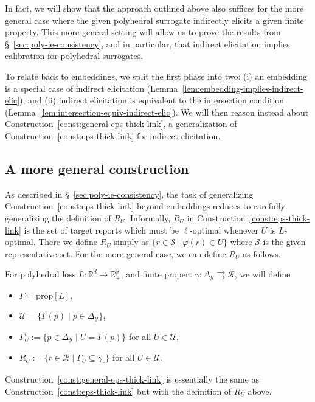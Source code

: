 \documentclass[twoside,11pt]{article}
\newcommand{\reals}{\mathbb{R}}
\newcommand{\prop}[1]{\mathrm{prop}[#1]}
\newcommand{\simplex}{\Delta_\Y}
\newcommand{\R}{\mathcal{R}}
\newcommand{\Sc}{\mathcal{S}}
\newcommand{\U}{\mathcal{U}}
\newcommand{\Y}{\mathcal{Y}}
\newcommand{\toto}{\rightrightarrows}
\begin{document}
In fact, we will show that the approach outlined above also suffices for the more general case where the given polyhedral surrogate indirectly elicits a given finite property.
This more general setting will allow us to prove the results from \S~\ref{sec:poly-ie-consistency}, and in particular, that indirect elicitation implies calibration for polyhedral surrogates.

To relate back to embeddings, we split the first phase into two: (i) an embedding is a special case of indirect elicitation (Lemma~\ref{lem:embedding-implies-indirect-elic}), and (ii) indirect elicitation is equivalent to the intersection condition (Lemma~\ref{lem:intersection-equiv-indirect-elic}).
We will then reason instead about Construction~\ref{const:general-eps-thick-link}, a generalization of Construction~\ref{const:eps-thick-link} for indirect elicitation.

\subsection{A more general construction}

As described in \S~\ref{sec:poly-ie-consistency}, the task of generalizing Construction~\ref{const:eps-thick-link} beyond embeddings reduces to carefully generalizing the definition of $R_U$.
Informally, $R_U$ in Construction~\ref{const:eps-thick-link} is the set of target reports which must be $\ell$-optimal whenever $U$ is $L$-optimal.
There we define $R_U$ simply as $\{r\in\Sc \mid \varphi(r) \in U\}$ where $\Sc$ is the given representative set.
For the more general case, we can define $R_U$ as follows.
\begin{definition}\label{def:general-link-defs}
  For polyhedral loss $L:\reals^d\to\reals^\Y_+$, and finite propert $\gamma:\simplex\toto\R$, we will define
  \begin{itemize}
  \item $\Gamma = \prop L$,
  \item $\U = \{\Gamma(p) \mid p \in \simplex\}$,
  \item $\Gamma_U := \{p\in\simplex \mid U = \Gamma(p)\}$ for all $U \in \U$,
  \item $R_U := \{r\in\R \mid \Gamma_U \subseteq \gamma_r\}$ for all $U \in \U$.
  \end{itemize}
\end{definition}

Construction~\ref{const:general-eps-thick-link} is essentially the same as Construction~\ref{const:eps-thick-link} but with the definition of $R_U$ above.
\end{document}
